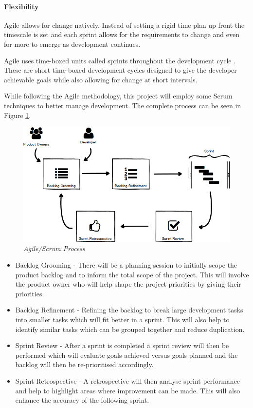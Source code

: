 \paragraph{Flexibility} Agile allows for change natively. Instead of setting a rigid time plan up front the timescale is set and each sprint allows for the requirements to change and even for more to emerge as development continues.

Agile uses time-boxed units called sprints throughout the development cycle \citep{Agile2016}. These are short time-boxed development cycles designed to give the developer achievable goals while also allowing for change at short intervals.

While following the Agile methodology, this project will employ some Scrum techniques to better manage development. The complete process can be seen in Figure \ref{fig:agile}.

\begin{figure}[!ht]
\centering
\includegraphics*[width=\textwidth]{images/scrum_process}
\caption{\em Agile/Scrum Process}
\label{fig:agile}
\end{figure}

\begin{itemize}
	\item Backlog Grooming - There will be a planning session to initially scope the product backlog and to inform the total scope of the project. This will involve the product owner who will help shape the project priorities by giving their priorities.
	\item Backlog Refinement - Refining the backlog to break large development tasks into smaller tasks which will fit better in a sprint. This will also help to identify similar tasks which can be grouped together and reduce duplication.
	\item Sprint Review - After a sprint is completed a sprint review will then be performed which will evaluate goals achieved versus goals planned and the backlog will then be re-prioritised accordingly.
	\item Sprint Retrospective - A retrospective will then analyse sprint performance and help to highlight areas where improvement can be made. This will also enhance the accuracy of the following sprint.
\end{itemize}

